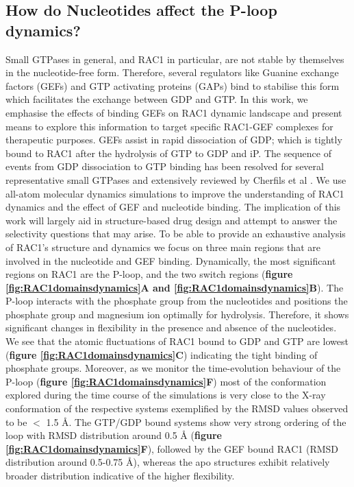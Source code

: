\documentclass[12pt, a4paper]{achemso}
\begin{document}
\subsection{How do Nucleotides affect the P-loop dynamics?} 
    Small GTPases in general, and RAC1 in particular, are not stable by themselves in the nucleotide-free form. Therefore, several regulators like Guanine exchange factors (GEFs) and GTP activating proteins (GAPs) bind to stabilise this form which facilitates the exchange between GDP and GTP. In this work, we emphasise the effects of binding GEFs on RAC1 dynamic landscape and present means to explore this information to target specific RAC1-GEF complexes for therapeutic purposes. GEFs assist in rapid dissociation of GDP; which is tightly bound to RAC1 after the hydrolysis of GTP to GDP and iP. The sequence of events from GDP dissociation to GTP binding has been resolved for several representative small GTPases and extensively reviewed by Cherfils et al \cite{cherfils1999gefs, cherfils2014gefs}. We use all-atom molecular dynamics simulations to improve the understanding of RAC1 dynamics and the effect of GEF and nucleotide binding. The implication of this work will largely aid in structure-based drug design and attempt to answer the selectivity questions that may arise. To be able to provide an exhaustive analysis of RAC1's structure and dynamics we focus on three main regions that are involved in the nucleotide and GEF binding.  Dynamically, the most significant regions on RAC1 are the P-loop, and the two switch regions (\textbf{figure \ref{fig:RAC1domainsdynamics}A and \ref{fig:RAC1domainsdynamics}B}). 
    The P-loop interacts with the phosphate group from the nucleotides and positions the phosphate group and magnesium ion optimally for hydrolysis. Therefore, it shows significant changes in flexibility in the presence and absence of the nucleotides. We see that the atomic fluctuations of RAC1 bound to GDP and GTP are lowest (\textbf{figure \ref{fig:RAC1domainsdynamics}C}) indicating the tight binding of phosphate groups. Moreover, as we monitor the time-evolution behaviour of the P-loop  (\textbf{figure \ref{fig:RAC1domainsdynamics}F}) most of the conformation explored during the time course of the simulations is very close to the X-ray conformation of the respective systems exemplified by the RMSD values observed to be $<$ 1.5 {\r{A}}. The GTP/GDP bound systems show very strong ordering of the loop with RMSD distribution around 0.5 {\r{A}} (\textbf{figure \ref{fig:RAC1domainsdynamics}F}), followed by the GEF bound RAC1 (RMSD distribution around 0.5-0.75 {\r{A}}), whereas the apo structures exhibit relatively broader distribution indicative of the higher flexibility. 
\end{document}
